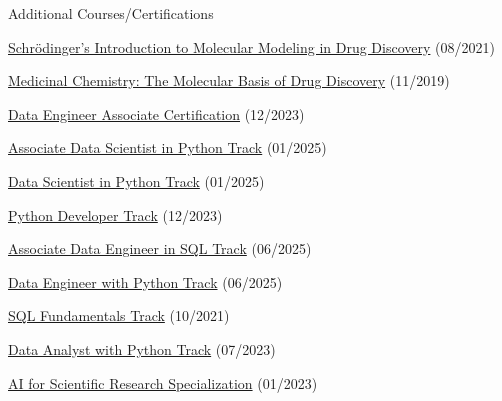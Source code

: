 \begin{cventries}
  \cventry
    {}
    {Additional Courses/Certifications}
    {}
    {}
    {
        \begin{cvitems}
            \item{\href{https://api.badgr.io/public/assertions/zZ7-bHnkTcm6H_UNr2s-LA}{Schrödinger's Introduction to Molecular Modeling in Drug Discovery} (08/2021)}           
            \item{\href{https://courses.edx.org/certificates/27307d91954041dab94af0ff554bc378}{Medicinal Chemistry: The Molecular Basis of Drug Discovery} (11/2019)}
            \item{\href{https://www.datacamp.com/certificate/DEA0011913814162}{Data Engineer Associate Certification} (12/2023)}
            \item{\href{https://www.datacamp.com/completed/statement-of-accomplishment/track/001ce60122d90d6117abb37e6b959eff79810b59}{Associate Data Scientist in Python Track} (01/2025)}
            \item{\href{https://www.datacamp.com/completed/statement-of-accomplishment/track/f94f0703ec170e3314fb2054504a159a3dd7c7ee}{Data Scientist in Python Track} (01/2025)}
            \item{\href{https://www.datacamp.com/statement-of-accomplishment/track/d27013d491083bee7eb7302d45d142e6eff5c4c9}{Python Developer Track} (12/2023)}
            \item{\href{https://www.datacamp.com/completed/statement-of-accomplishment/track/ddd62c1f2ec3bfe472fa8be68f9cba3861cee587}{Associate Data Engineer in SQL Track} (06/2025)}
            \item{\href{https://www.datacamp.com/completed/statement-of-accomplishment/track/bd98710517291375d82b436a14bc7a9120a5945a}{Data Engineer with Python Track} (06/2025)}
            \item{\href{https://www.datacamp.com/statement-of-accomplishment/track/941904e6394e2951693441d466f4643e5edfb4de}{SQL Fundamentals Track} (10/2021)}
            \item{\href{https://www.datacamp.com/completed/statement-of-accomplishment/track/4d9fb22f2514baecb5866aecd4421ba951e418a1}{Data Analyst with Python Track} (07/2023)}
            \item{\href{https://www.coursera.org/account/accomplishments/specialization/XU23J53N3SAW}{AI for Scientific Research Specialization} (01/2023)}

\end{cvitems}}
\end{cventries}
